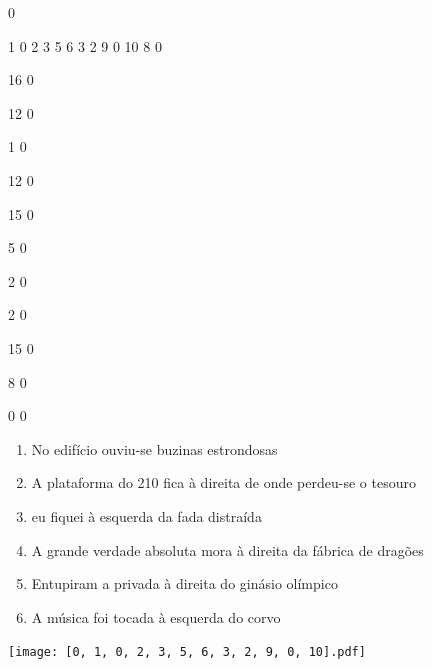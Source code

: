 \documentclass[12pt]{article}
\begin{document}
		\vfill  
		  
{
	0	%

	1	%
	0	%
	2	%
	3	%
	5	%
	6	%
	3	%
	2	%
	9	%
	0	%
	10	%
	8	%
	0	%

	16	%
	0	%

	12	%
	0	%

	1	%
	0	%

	12	%
	0	%

	15	%
	0	%

	5	%
	0	%

	2	%
	0	%

	2	%
	0	%

	15	%
	0	%

	8	%
	0	%

	0	%
	0	%
}	  
		    	

		 

\pagebreak


	\begin{enumerate}
		  \sffamily %
		  \large %


\vfill \item
No edifício	%
ouviu-se buzinas estrondosas	%

\vfill \item
A plataforma do 210 fica	%
à direita
de onde perdeu-se o tesouro	%

\vfill \item
eu fiquei	%
à esquerda
da fada distraída	%

\vfill \item
A grande verdade absoluta mora	%
à direita
da fábrica de dragões	%

\vfill \item
Entupiram a privada	%
à direita
do ginásio olímpico	%

\vfill \item
A música foi tocada	%
à esquerda
do corvo	%
	\end{enumerate}
		  
		  \hfill

		  \vfill

\texttt{[image: [0, 1, 0, 2, 3, 5, 6, 3, 2, 9, 0, 10].pdf]}
\end{document}
